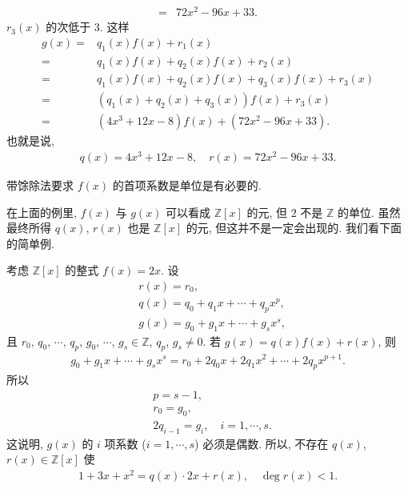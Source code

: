 \begin{example}
\begin{align*}
        = {} & 72x^2 - 96x + 33.
    \end{align*}
    $r_3 (x)$ 的次低于 $3$. 这样
    \begin{align*}
        g(x)
        = {} & q_1 (x) f(x) + r_1 (x)                               \\
        = {} & q_1 (x) f(x) + q_2 (x) f(x) + r_2 (x)                \\
        = {} & q_1 (x) f(x) + q_2 (x) f(x) + q_3 (x) f(x) + r_3 (x) \\
        = {} & (q_1 (x) + q_2 (x) + q_3 (x)) f(x) + r_3 (x)         \\
        = {} & (4x^3 + 12x - 8) f(x) + (72x^2 - 96x + 33).
    \end{align*}
    也就是说,
    \begin{align*}
        q(x) = 4x^3 + 12x - 8, \quad r(x) = 72x^2 - 96x + 33.
    \end{align*}
\end{example}

\begin{remark}
    带馀除法要求 $f(x)$ 的首项系数是单位是有必要的.

    在上面的例里, $f(x)$ 与 $g(x)$ 可以看成 $\mathbb{Z}[x]$ 的元, 但 $2$ 不是 $\mathbb{Z}$ 的单位. 虽然最终所得 $q(x)$, $r(x)$ 也是 $\mathbb{Z}[x]$ 的元, 但这并不是一定会出现的. 我们看下面的简单例.

    考虑 $\mathbb{Z}[x]$ 的整式 $f(x)=2x$. 设
    \begin{align*}
         & r(x) = r_0,                            \\
         & q(x) = q_0 + q_1 x + \cdots + q_p x^p, \\
         & g(x) = g_0 + g_1 x + \cdots + g_s x^s,
    \end{align*}
    且 $r_0$, $q_0$, $\cdots$, $q_p$, $g_0$, $\cdots$, $g_s \in \mathbb{Z}$, $q_p$, $g_s \neq 0$. 若 $g(x) = q(x)f(x) + r(x)$, 则
    \begin{align*}
        g_0 + g_1 x + \cdots + g_s x^s = r_0 + 2q_0 x + 2q_1 x^2 + \cdots + 2q_p x^{p+1}.
    \end{align*}
    所以
    \begin{align*}
         & p = s - 1,                          \\
         & r_0 = g_0,                          \\
         & 2q_{i-1} = g_i, \quad i=1,\cdots,s.
    \end{align*}
    这说明, $g(x)$ 的 $i$ 项系数 ($i=1,\cdots,s$) 必须是偶数. 所以, 不存在 $q(x)$, $r(x) \in \mathbb{Z}[x]$ 使
    \begin{align*}
        1 + 3x + x^2 = q(x) \cdot 2x + r(x), \quad \deg r(x) < 1.
    \end{align*}
\end{remark}

